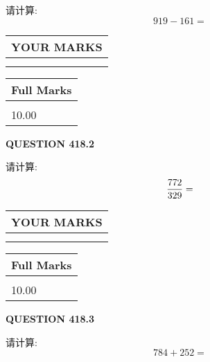 \documentclass{ctexart}
\begin{document}
  
 
请计算:
\begin{equation}
919 -   %
161 = \nonumber
\end{equation}
 

 

 
  
\vspace{0.2in}
  
\noindent\begin{tabular}{|l|}
\hline
 YOUR MARKS  \\
\hline
 \\ 
 \\ 
\hline
\end{tabular}
\hspace{0.05in} \begin{tabular}{|l|}
\hline
 Full Marks  \\
\hline
 \\ 
10.00 \\
\hline
\end{tabular}
{\textbf{\Large{QUESTION
418.2 
}}}
  
  
 
请计算:
\begin{equation}
\frac { %
772 }  {  %
329} = \nonumber
\end{equation}
 

 

 
  
\vspace{0.2in}
  
\noindent\begin{tabular}{|l|}
\hline
 YOUR MARKS  \\
\hline
 \\ 
 \\ 
\hline
\end{tabular}
\hspace{0.05in} \begin{tabular}{|l|}
\hline
 Full Marks  \\
\hline
 \\ 
10.00 \\
\hline
\end{tabular}
{\textbf{\Large{QUESTION
418.3 
}}}
  
  
 
请计算:
\begin{equation}
784 +  %
252 = \nonumber
\end{equation}
 

 

 
  
\end{document}
